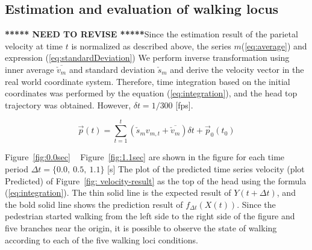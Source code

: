 \documentclass{sigchi}
\begin{document}
\subsection{Estimation and evaluation of walking locus}

{\bf ****** NEED TO REVISE *****}Since the estimation result of the parietal velocity at time $ t $ is normalized as described above, the series $ m $(\ref {eq:average}) and expression (\ref {eq:standardDeviation}) We perform inverse transformation using inner average $ \overline {\check {v} _ {m}} $ and standard deviation $ \check {s} _ m $ and derive the velocity vector in the real world coordinate system. Therefore, time integration based on the initial coordinates was performed by the equation (\ref {eq:integration}), and the head top trajectory was obtained. However, $ \delta t = 1/300 $ [fps].

\begin{equation}
\vec{p}(t) = \sum^{t}_{t=1}(\check{s}_m  v_{m,t} +  \overline{\check{v}_{m}})  \delta t+ \vec{p}_0(t_0)
\label{eq:integration}
\end{equation}


Figure~\ref{fig:0.0sec} ~ Figure~\ref{fig:1.1sec} are shown in the figure for each time period $ \Delta t = \{0.0, \ 0.5, \ 1.1 \} $ [s] The plot of the predicted time series velocity (plot Predicted) of Figure~\ref{fig: velocity-result} as the top of the head using the formula (\ref {eq:integration}). The thin solid line is the expected result of $ Y (t + \Delta t) $, and the bold solid line shows the prediction result of $ f_ {\Delta t} (X (t)) $. Since the pedestrian started walking from the left side to the right side of the figure and five branches near the origin, it is possible to observe the state of walking according to each of the five walking loci conditions.
\end{document}
